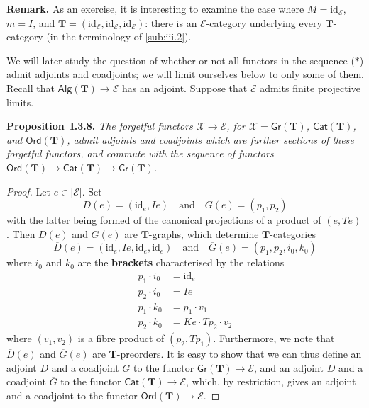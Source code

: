 \documentclass{article}
\newenvironment{itenv}[1]
  {\phantomsection\par\medskip\noindent\textbf{#1.}\itshape}
  {\par\medskip}
\newenvironment{rmenv}[1]
  {\phantomsection\par\medskip\noindent\textbf{#1.}\rmfamily}
  {\par\medskip}
\newcommand{\unsure}[1]{{\color{purple}\textbf{#1}}}
\newcommand{\id}{\mathrm{id}}
\newcommand{\TT}{\mathbf{T}}
\newcommand{\textand}{\quad\text{and}\quad}
\newcommand{\cat}[1]{\mathcal{#1}}
\newcommand{\Cat}[1]{\mathsf{#1}}
\newcommand{\set}[1]{|#1|}
\newcommand{\Gr}[1]{\Cat{Gr}(#1)}
\newcommand{\Alg}[1]{\Cat{Alg}(#1)}
\newcommand{\Ord}[1]{\Cat{Ord}(#1)}
\begin{document}
\begin{rmenv}{Remark}
  As an exercise, it is interesting to examine the case where $M=\id_\cat{E}$, $m=I$, and $\TT=(\id_\cat{E},\id_\cat{E},\id_\cat{E})$: there is an $\cat{E}$-category underlying every $\TT$-category (in the terminology of \cref{sub:iii.2}).
\end{rmenv}

We will later study the question of whether or not all functors in the sequence ($\ast$) admit adjoints and coadjoints;
we will limit ourselves below to only some of them.
Recall that $\Alg{\TT}\to\cat{E}$ has an adjoint.
Suppose that $\cat{E}$ admits finite projective limits.

\begin{itenv}{Proposition~I.3.8}
  The forgetful functors $\cat{X}\to\cat{E}$, for $\cat{X}=\Gr{\TT}$, $\Cat{Cat}(\TT)$, and $\Ord{\TT}$, admit adjoints and coadjoints which are further sections of these forgetful functors, and commute with the sequence of functors $\Ord{\TT}\to\Cat{Cat}(\TT)\to\Gr{\TT}$.
\end{itenv}

\begin{proof}
  Let $e\in\set{\cat{E}}$.
  Set
  \[
    D(e) = (\id_e,Ie)
    \textand
    G(e) = (p_1,p_2)
  \]
  with the latter being formed of the canonical projections of a product of $(e,Te)$.
  Then $D(e)$ and $G(e)$ are $\TT$-graphs, which determine $\TT$-categories
  \[
    \overline{D}(e) = (\id_e,Ie,\id_e,\id_e)
    \textand
    \overline{G}(e) = (p_1,p_2,i_0,k_0)
  \]
  where $i_0$ and $k_0$ are the \unsure{brackets} characterised by the relations
  \[
    \begin{aligned}
      p_1\cdot i_0
    & = \id_e
    \\p_2\cdot i_0
    & = Ie
    \\p_1\cdot k_0
    & = p_1\cdot v_1
    \\p_2\cdot k_0
    & = Ke\cdot Tp_2\cdot v_2
    \end{aligned}
  \]
  where $(v_1,v_2)$ is a fibre product of $(p_2,Tp_1)$.
  Furthermore, we note that $\overline{D}(e)$ and $\overline{G}(e)$ are $\TT$-preorders.
  It is easy to show that we can thus define an adjoint $D$ and a coadjoint $G$ to the functor $\Gr{\TT}\to\cat{E}$, and an adjoint $\overline{D}$ and a coadjoint $\overline{G}$ to the functor $\Cat{Cat}(\TT)\to\cat{E}$, which, by restriction, gives an adjoint and a coadjoint to the functor $\Ord{\TT}\to\cat{E}$.
\end{proof}
\end{document}
